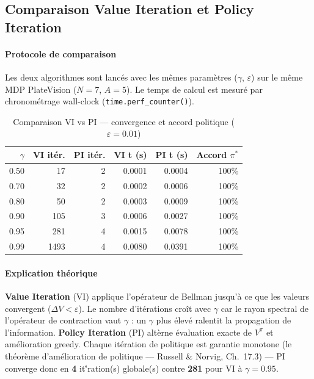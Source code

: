 \subsection{Comparaison Value Iteration et Policy Iteration}
\label{sec:c:comparison}

\paragraph{Protocole de comparaison}
Les deux algorithmes sont lanc\'{e}s avec les m\^{e}mes param\`{e}tres
($\gamma$, $\varepsilon$) sur le m\^{e}me MDP PlateVision ($N=7$, $A=5$).
Le temps de calcul est mesur\'{e} par chronom\'{e}trage wall-clock
(\texttt{time.perf\_counter()}).

\begin{table}[H]
\centering
\caption{Comparaison VI vs PI --- convergence et accord politique ($\varepsilon=0.01$)}
\label{tab:c:vi_pi_comparison}
\begin{tabular}{rrrrrr}
\toprule
$\gamma$ & VI it\'{e}r. & PI it\'{e}r. & VI t (s) & PI t (s) & Accord $\pi^*$ \\
\midrule
  0.50 & 17 & 2 & 0.0001 & 0.0004 & 100\% \\
  0.70 & 32 & 2 & 0.0002 & 0.0006 & 100\% \\
  0.80 & 50 & 2 & 0.0003 & 0.0009 & 100\% \\
  0.90 & 105 & 3 & 0.0006 & 0.0027 & 100\% \\
  0.95 & 281 & 4 & 0.0015 & 0.0078 & 100\% \\
  0.99 & 1493 & 4 & 0.0080 & 0.0391 & 100\% \\

\bottomrule
\end{tabular}
\end{table}

\paragraph{Explication th\'{e}orique}
\textbf{Value Iteration} (VI) applique l'op\'{e}rateur de Bellman
jusqu'\`{a} ce que les valeurs convergent ($\Delta V < \varepsilon$).
Le nombre d'it\'{e}rations cro\^{i}t avec $\gamma$ car le rayon spectral
de l'op\'{e}rateur de contraction vaut $\gamma$ : un $\gamma$ plus \'{e}lev\'{e}
ralentit la propagation de l'information.
\textbf{Policy Iteration} (PI) alt\`{e}rne \'{e}valuation exacte de
$V^{\pi}$ et am\'{e}lioration greedy. Chaque it\'{e}ration de politique
est garantie monotone (le th\'{e}or\`{e}me d'am\'{e}lioration de politique
--- Russell \& Norvig, Ch.~17.3) --- PI converge donc en
\textbf{4} it\'{'}ration(s) globale(s) contre \textbf{281} pour VI
\`{a} $\gamma=0.95$.

